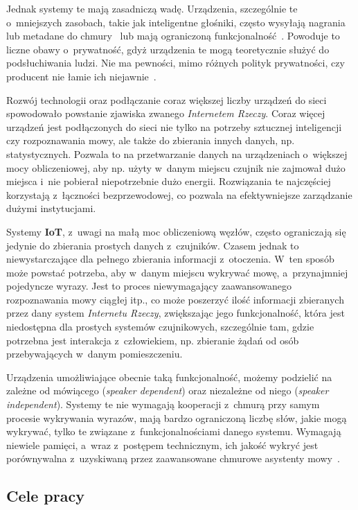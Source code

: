 Jednak systemy te mają zasadniczą wadę. Urządzenia, szczególnie te o~mniejszych zasobach, takie jak inteligentne głośniki, często wysyłają nagrania lub metadane do chmury~\cite{JBL:Support} lub mają ograniczoną funkcjonalność~\cite{Google:Support}. Powoduje to liczne obawy o~prywatność, gdyż urządzenia te mogą teoretycznie służyć do podsłuchiwania ludzi. Nie ma pewności, mimo różnych polityk prywatności, czy producent nie łamie ich niejawnie~\cite{Google:Privacy}.

Rozwój technologii oraz podłączanie coraz większej liczby urządzeń do sieci spowodowało powstanie zjawiska zwanego \textit{Internetem Rzeczy}. Coraz więcej urządzeń jest podłączonych do sieci nie tylko na potrzeby sztucznej inteligencji czy rozpoznawania mowy, ale także do zbierania innych danych, np. statystycznych. Pozwala to na przetwarzanie danych na urządzeniach o~większej mocy obliczeniowej, aby np. użyty w~danym miejscu czujnik nie zajmował dużo miejsca i~nie pobierał niepotrzebnie dużo energii. Rozwiązania te najczęściej korzystają z~łączności bezprzewodowej, co pozwala na efektywniejsze zarządzanie dużymi instytucjami.

Systemy \textbf{IoT}, z~uwagi na małą moc obliczeniową węzłów, często ograniczają się jedynie do zbierania prostych danych z~czujników. Czasem jednak to niewystarczające dla pełnego zbierania informacji z~otoczenia. W~ten sposób może powstać potrzeba, aby w~danym miejscu wykrywać mowę, a~przynajmniej pojedyncze wyrazy. Jest to proces niewymagający zaawansowanego rozpoznawania mowy ciągłej itp., co może poszerzyć ilość informacji zbieranych przez dany system \textit{Internetu Rzeczy}, zwiększając jego funkcjonalność, która jest niedostępna dla prostych systemów czujnikowych, szczególnie tam, gdzie potrzebna jest interakcja z~człowiekiem, np. zbieranie żądań od osób przebywających w~danym pomieszczeniu.

Urządzenia umożliwiające obecnie taką funkcjonalność, możemy podzielić na zależne od mówiącego (\textit{speaker dependent}) oraz niezależne od niego (\textit{speaker independent}). Systemy te nie wymagają kooperacji z~chmurą przy samym procesie wykrywania wyrazów, mają bardzo ograniczoną liczbę słów, jakie mogą wykrywać, tylko te związane z~funkcjonalnościami danego systemu. Wymagają niewiele pamięci, a~wraz z~postępem technicznym, ich jakość wykryć jest porównywalna z~uzyskiwaną przez zaawansowane chmurowe asystenty mowy~\cite{LED:Speech}.

\subsection{Cele pracy}

